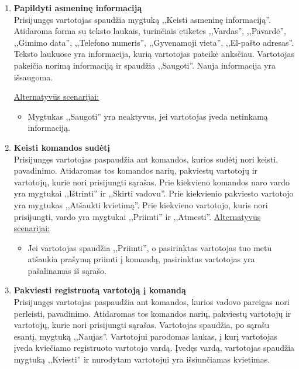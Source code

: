 \documentclass{VUMIFPSkursinis}
\begin{document}
\begin{enumerate} [label = \textbf{U\arabic*.}]
				\underline{Alternatyvūs scenarijai:}
				\begin{itemize}
					\item Mygtukas ,,Siųsti'' yra neaktyvus, jei vartotojas paliko tuščią teksto lauką.
					\item Išmetamas pranešimas, jei failas, kurį vartotojas norį įkelti, viršija 2 MB.
					\item Mygtukas ,,Pridėti failą'' yra neaktyvus, jei vartotojas jau įkėlė 10 failų.
				\end{itemize}
				
			\item \textbf{Papildyti asmeninę informaciją} \\
				Prisijungęs vartotojas spaudžia mygtuką ,,Keisti asmeninę informaciją''. Atidaroma forma su teksto laukais, turinčiais etiketes ,,Vardas'', ,,Pavardė'', ,,Gimimo data'', ,,Telefono numeris'', ,,Gyvenamoji vieta'', ,,El-pašto adresas''. Teksto laukuose yra informacija, kurią vartotojas pateikė anksčiau. Vartotojas pakeičia norimą informaciją ir spaudžia ,,Saugoti''. Nauja informacija yra išsaugoma.
				
				\underline{Alternatyvūs scenarijai:}
				\begin{itemize}
					\item Mygtukas ,,Saugoti'' yra neaktyvus, jei vartotojas įveda netinkamą informaciją.
				\end{itemize}

			\item \textbf{Keisti komandos sudėtį} \\
				Prisijungęs vartotojas paspaudžia ant komandos, kurios sudėtį nori keisti, pavadinimo. Atidaromas tos komandos narių, pakviestų vartotojų ir vartotojų, kurie nori prisijungti sąrašas. Prie kiekvieno komandos naro vardo yra mygtukai ,,Ištrinti'' ir ,,Skirti vadovu''. Prie kiekvienio pakviesto vartotojo yra mygtukas ,,Atšaukti kvietimą''. Prie kiekvieno vartotojo, kuris nori prisijungti, vardo yra mygtukai ,,Priimti'' ir ,,Atmesti''. 
				\underline{Alternatyvūs scenarijai:}
				\begin{itemize}
					\item Jei vartotojas spaudžia ,,Priimti'', o pasirinktas vartotojas tuo metu atšaukia prašymą priimti į komandą, pasirinktas vartotojas yra pašalinamas iš sąrašo.
				\end{itemize}
				
			\item \textbf{Pakviesti registruotą vartotoją į komandą}   \\
					Prisijungęs vartotojas paspaudžia ant komandos, kurios vadovo pareigas nori perleisti, pavadinimo. Atidaromas tos komandos narių, pakviestų vartotojų ir vartotojų, kurie nori prisijungti sąrašas.  
					Vartotojas spaudžia, po sąrašu esantį, mygtuką ,,Naujas''. Vartotojui parodomas laukas, į kurį vartotojas įveda kviečiamo registruoto vartotojo vardą. Įvedęs vardą, vartotojas spaudžia mygtuką ,,Kviesti'' ir nurodytam vartotojui yra išsiunčiamas kvietimas.
					

\end{enumerate}
\end{document}
